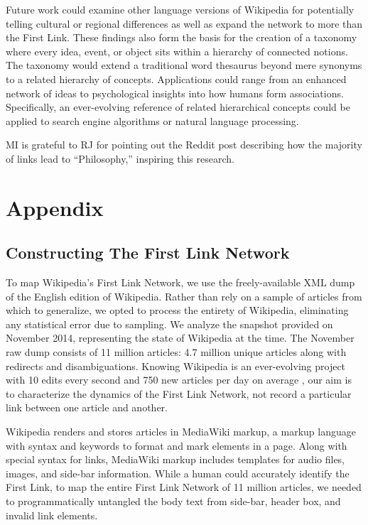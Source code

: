 \documentclass[pre,twocolumn,twoside,superscriptaddress,floatfix, aps, 10pt]{revtex4-1}
\begin{document}
Future work could examine other language versions of Wikipedia for potentially telling cultural or regional differences as well as expand the network to more than the First Link.
These findings also form the basis for the creation of a taxonomy where 
every idea, event, or object sits within a hierarchy of connected notions.
The taxonomy would extend a traditional word thesaurus beyond mere synonyms to a related hierarchy of concepts.
Applications could range from an enhanced network of ideas to psychological insights into how humans form associations.
Specifically, an ever-evolving reference of related hierarchical concepts could be applied to search engine algorithms 
or natural language processing.


\acknowledgments
MI is grateful to RJ for pointing out the Reddit post 
\cite{reddit}
describing how the majority of links lead to ``Philosophy,'' inspiring this research.


\newpage

\section{Appendix}

\subsection{Constructing The First Link Network}

To map Wikipedia's First Link Network, we use the freely-available XML dump of the English edition of Wikipedia. 
Rather than rely on a sample of articles from which to generalize, we opted to process the entirety of Wikipedia, 
eliminating any statistical error due to sampling.
We analyze the snapshot provided on November 2014, representing the state of Wikipedia at the time.
The November raw dump consists of 11 million articles: 4.7 million unique articles along with redirects
and disambiguations.
Knowing Wikipedia is an ever-evolving project with 10 edits every second and 750 new articles per day on average
\cite{wiki_edits},
our aim is to characterize the dynamics of the First Link Network, not record a particular link between one
article and another.

Wikipedia renders and stores articles in MediaWiki markup, a markup language with syntax and keywords to format and mark elements in a page. Along with special syntax for links, MediaWiki markup includes templates for audio files, images, and side-bar
information.
While a human could accurately identify the First Link, to map the entire First Link Network of 11 million articles, we needed to programmatically untangled the body text from side-bar, header box, and invalid link elements.
\end{document}

